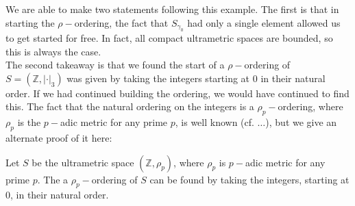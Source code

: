 We are able to make two statements following this example. The first is that in starting the $\rho-$ordering, the fact that $S_{\gamma_0}$ had only a single element allowed us to get started for free. In fact,  all compact ultrametric spaces are bounded, so this is always the case. \\

The second takeaway is that we found the start of a $\rho-$ordering of $S=(\mathbb{Z}, \lvert \cdot \rvert_3)$ was given by taking the integers starting at $0$ in their natural order. If we had continued building the ordering, we would have continued to find this. The fact that the natural ordering on the integers is a $\rho_p-$ordering, where $\rho_p$ is the $p-$adic metric for any prime $p$, is well known (cf. $\ldots$), but we give an alternate proof of it here: 

\begin{corollary*} 
Let $S$ be the ultrametric space $(\mathbb{Z}, \rho_p)$, where $\rho_p$ is  $p-$adic metric for any prime $p$. The a $\rho_p-$ordering of $S$ can be found by taking the integers, starting at $0$, in their natural order.
\end{corollary*}


